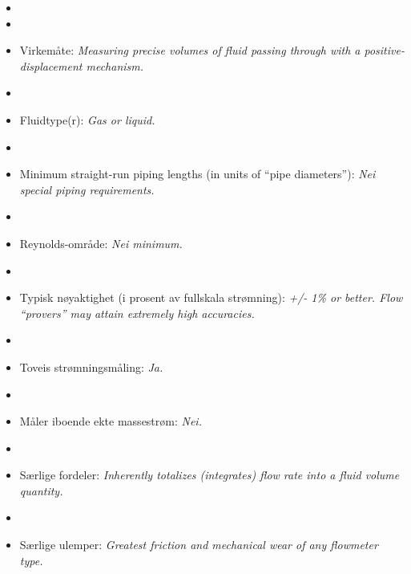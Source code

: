 \begin{itemize}
\goodbreak
\item{} 
\vskip 5pt
\item\item{} Virkemåte: {\it Measuring precise volumes of fluid passing through with a positive-displacement mechanism.}
\vskip 5pt
\item\item{} Fluidtype(r): {\it Gas or liquid.}
\vskip 5pt
\item\item{} Minimum straight-run piping lengths (in units of ``pipe diameters''): {\it Nei special piping requirements.}
\vskip 5pt
\item\item{} Reynolds-område: {\it Nei minimum.}
\vskip 5pt
\item\item{} Typisk nøyaktighet (i prosent av fullskala strømning): {\it +/- 1\% or better.  Flow ``provers'' may attain extremely high accuracies.}
\vskip 5pt
\item\item{} Toveis strømningsmåling: {\it Ja.}
\vskip 5pt
\item\item{} Måler iboende ekte massestrøm: {\it Nei.}
\vskip 5pt
\item\item{} Særlige fordeler: {\it Inherently totalizes (integrates) flow rate into a fluid volume quantity.}
\vskip 5pt
\item\item{} Særlige ulemper: {\it Greatest friction and mechanical wear of any flowmeter type.}
\end{itemize}

